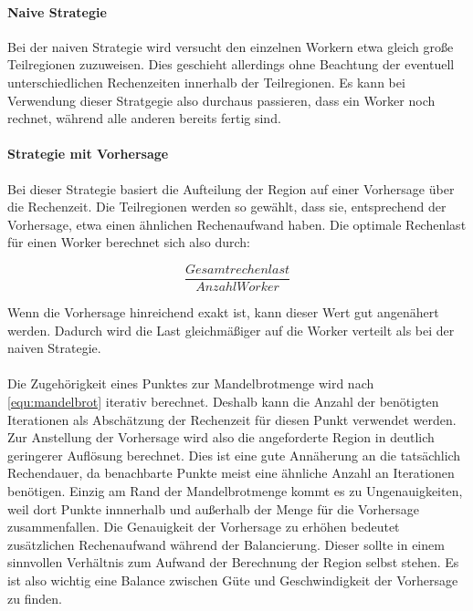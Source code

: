 \paragraph{Naive Strategie}
Bei der naiven Strategie wird versucht den einzelnen Workern etwa gleich große Teilregionen zuzuweisen.
Dies geschieht allerdings ohne Beachtung der eventuell unterschiedlichen Rechenzeiten innerhalb der Teilregionen.
Es kann bei Verwendung dieser Stratgegie also durchaus passieren, dass ein Worker noch rechnet, während alle anderen bereits fertig sind.

\paragraph{Strategie mit Vorhersage}
Bei dieser Strategie basiert die Aufteilung der Region auf einer Vorhersage über die Rechenzeit.
Die Teilregionen werden so gewählt, dass sie, entsprechend der Vorhersage, etwa einen ähnlichen Rechenaufwand haben.
Die optimale Rechenlast für einen Worker berechnet sich also durch:

\begin{equation}\label{equ:desiredN}
	\frac{Gesamtrechenlast}{AnzahlWorker}
\end{equation}

Wenn die Vorhersage hinreichend exakt ist, kann dieser Wert gut angenähert werden.
Dadurch wird die Last gleichmäßiger auf die Worker verteilt als bei der naiven Strategie.

\paragraph*{}\label{par:load_balancing_prediction}
Die Zugehörigkeit eines Punktes zur Mandelbrotmenge wird nach \autoref{equ:mandelbrot} iterativ berechnet.
Deshalb kann die Anzahl der benötigten Iterationen als Abschätzung der Rechenzeit für diesen Punkt verwendet werden.
Zur Anstellung der Vorhersage wird also die angeforderte Region in deutlich geringerer Auflösung berechnet.
Dies ist eine gute Annäherung an die tatsächlich Rechendauer, da benachbarte Punkte meist eine ähnliche Anzahl an Iterationen benötigen.
Einzig am Rand der Mandelbrotmenge kommt es zu Ungenauigkeiten, weil dort Punkte innnerhalb und außerhalb der Menge für die Vorhersage zusammenfallen.
Die Genauigkeit der Vorhersage zu erhöhen bedeutet zusätzlichen Rechenaufwand während der Balancierung.
Dieser sollte in einem sinnvollen Verhältnis zum Aufwand der Berechnung der Region selbst stehen.
Es ist also wichtig eine Balance zwischen Güte und Geschwindigkeit der Vorhersage zu finden.

